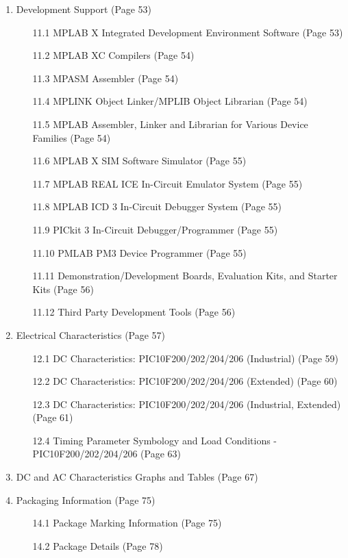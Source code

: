 \documentclass[12pt, letterpaper]{article}
\begin{document}
\begin{enumerate}
  \item Development Support (Page 53)
  \begin{enumerate}
    \item [11.1] MPLAB X Integrated Development Environment Software (Page 53)
    \item [11.2] MPLAB XC Compilers (Page 54)
    \item [11.3] MPASM Assembler (Page 54)
    \item [11.4] MPLINK Object Linker/MPLIB Object Librarian (Page 54)
    \item [11.5] MPLAB Assembler, Linker and Librarian for Various Device Families (Page 54)
    \item [11.6] MPLAB X SIM Software Simulator (Page 55)
    \item [11.7] MPLAB REAL ICE In-Circuit Emulator System (Page 55)
    \item [11.8] MPLAB ICD 3 In-Circuit Debugger System (Page 55)
    \item [11.9] PICkit 3 In-Circuit Debugger/Programmer (Page 55)
    \item [11.10] PMLAB PM3 Device Programmer (Page 55)
    \item [11.11] Demonstration/Development Boards, Evaluation Kits, and Starter Kits (Page 56)
    \item [11.12] Third Party Development Tools (Page 56)
  \end{enumerate}

  \item Electrical Characteristics (Page 57)
  \begin{enumerate}
    \item [12.1] DC Characteristics: PIC10F200/202/204/206 (Industrial) (Page 59)
    \item [12.2] DC Characteristics: PIC10F200/202/204/206 (Extended) (Page 60)
    \item [12.3] DC Characteristics: PIC10F200/202/204/206 (Industrial, Extended) (Page 61)
    \item [12.4] Timing Parameter Symbology and Load Conditions - PIC10F200/202/204/206 (Page 63)
  \end{enumerate}

  \item DC and AC Characteristics Graphs and Tables (Page 67)

  \item Packaging Information (Page 75)
  \begin{enumerate}
    \item [14.1] Package Marking Information (Page 75)
    \item [14.2] Package Details (Page 78)
  \end{enumerate}


\end{enumerate}
\end{document}

